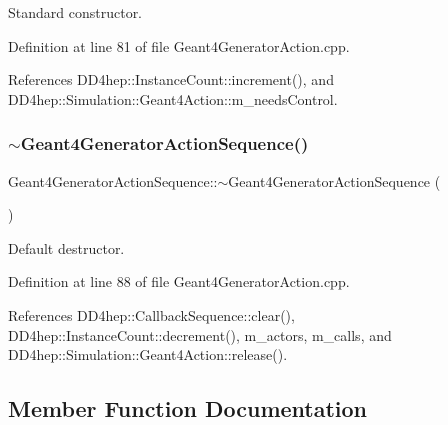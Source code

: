 Standard constructor. 



Definition at line 81 of file Geant4\+Generator\+Action.\+cpp.



References D\+D4hep\+::\+Instance\+Count\+::increment(), and D\+D4hep\+::\+Simulation\+::\+Geant4\+Action\+::m\+\_\+needs\+Control.

\hypertarget{class_d_d4hep_1_1_simulation_1_1_geant4_generator_action_sequence_a69d6b2986aeafa1e9951700f4d023455}{}\label{class_d_d4hep_1_1_simulation_1_1_geant4_generator_action_sequence_a69d6b2986aeafa1e9951700f4d023455} 
\subsubsection{\texorpdfstring{$\sim$\+Geant4\+Generator\+Action\+Sequence()}{~Geant4GeneratorActionSequence()}}
{\footnotesize\ttfamily Geant4\+Generator\+Action\+Sequence\+::$\sim$\+Geant4\+Generator\+Action\+Sequence (\begin{DoxyParamCaption}{ }\end{DoxyParamCaption})\hspace{0.3cm}{\ttfamily [virtual]}}



Default destructor. 



Definition at line 88 of file Geant4\+Generator\+Action.\+cpp.



References D\+D4hep\+::\+Callback\+Sequence\+::clear(), D\+D4hep\+::\+Instance\+Count\+::decrement(), m\+\_\+actors, m\+\_\+calls, and D\+D4hep\+::\+Simulation\+::\+Geant4\+Action\+::release().



\subsection{Member Function Documentation}
\hypertarget{class_d_d4hep_1_1_simulation_1_1_geant4_generator_action_sequence_ac6d847bdeeaa2b6bd46f1ae89fc15277}{}\label{class_d_d4hep_1_1_simulation_1_1_geant4_generator_action_sequence_ac6d847bdeeaa2b6bd46f1ae89fc15277} 

